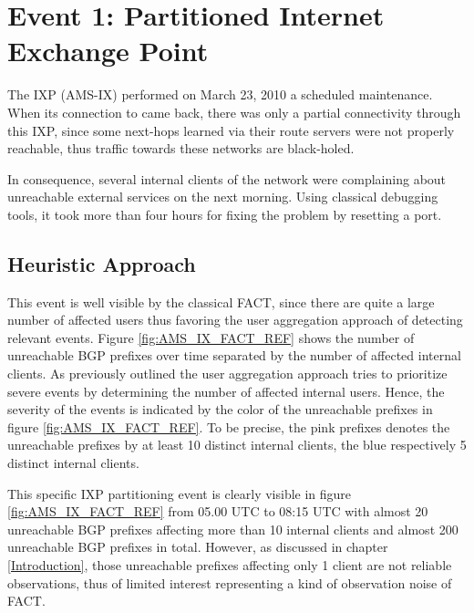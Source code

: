 \section{Event 1: Partitioned Internet Exchange Point}

The IXP \citet{AMS-IX}(AMS-IX) performed on March 23, 2010 a scheduled 
maintenance. When its connection to \citet{switch} came back, there was only a 
partial connectivity through this IXP, since some next-hops learned via their 
route servers were not properly reachable, thus traffic towards these networks 
are black-holed.\citep{SchatzmannPAM2011}

In consequence, several internal clients of the \citet{switch} network were 
complaining about unreachable external services on the next morning. Using 
classical debugging tools, it took more than four hours for fixing the problem 
by resetting a port.\citep{SchatzmannPAM2011}

\subsection{Heuristic Approach}
This event is well visible by the classical FACT, since there are quite a large 
number of affected users thus favoring the user aggregation approach of 
detecting relevant events. Figure \ref{fig:AMS_IX_FACT_REF} shows the number of 
unreachable BGP prefixes over time separated by the number of affected internal 
clients. As previously outlined the user aggregation approach tries to 
prioritize severe events by determining the number of affected internal users. 
Hence, the severity of the events is indicated by the color of the unreachable 
prefixes in figure \ref{fig:AMS_IX_FACT_REF}. To be precise, the pink prefixes 
denotes the unreachable prefixes by at least 10 distinct internal clients, the 
blue respectively 5 distinct internal clients.

This specific IXP partitioning event is clearly visible in figure  
\ref{fig:AMS_IX_FACT_REF} from 05.00 UTC to 08:15 UTC with almost 20 unreachable 
BGP prefixes affecting more than 10 internal clients and almost 200 unreachable 
BGP prefixes in total. However, as discussed in chapter \ref{Introduction}, 
those unreachable prefixes affecting only 1 client are not reliable 
observations, thus of limited interest representing a kind of observation noise 
of FACT.

